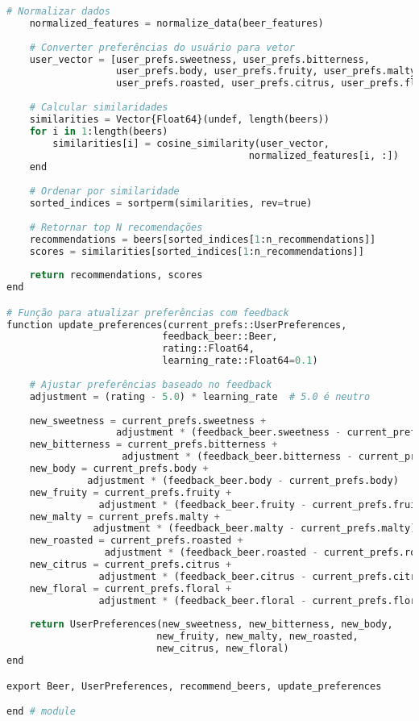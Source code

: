 \documentclass[12pt,a4paper]{article}
\begin{document}
\begin{lstlisting}[language=Python, caption=Código principal do sistema de recomendação]
    # Normalizar dados
    normalized_features = normalize_data(beer_features)
    
    # Converter preferências do usuário para vetor
    user_vector = [user_prefs.sweetness, user_prefs.bitterness,
                   user_prefs.body, user_prefs.fruity, user_prefs.malty,
                   user_prefs.roasted, user_prefs.citrus, user_prefs.floral]
    
    # Calcular similaridades
    similarities = Vector{Float64}(undef, length(beers))
    for i in 1:length(beers)
        similarities[i] = cosine_similarity(user_vector, 
                                          normalized_features[i, :])
    end
    
    # Ordenar por similaridade
    sorted_indices = sortperm(similarities, rev=true)
    
    # Retornar top N recomendações
    recommendations = beers[sorted_indices[1:n_recommendations]]
    scores = similarities[sorted_indices[1:n_recommendations]]
    
    return recommendations, scores
end

# Função para atualizar preferências com feedback
function update_preferences(current_prefs::UserPreferences,
                           feedback_beer::Beer,
                           rating::Float64,
                           learning_rate::Float64=0.1)
    
    # Ajustar preferências baseado no feedback
    adjustment = (rating - 5.0) * learning_rate  # 5.0 é neutro
    
    new_sweetness = current_prefs.sweetness + 
                   adjustment * (feedback_beer.sweetness - current_prefs.sweetness)
    new_bitterness = current_prefs.bitterness + 
                    adjustment * (feedback_beer.bitterness - current_prefs.bitterness)
    new_body = current_prefs.body + 
              adjustment * (feedback_beer.body - current_prefs.body)
    new_fruity = current_prefs.fruity + 
                adjustment * (feedback_beer.fruity - current_prefs.fruity)
    new_malty = current_prefs.malty + 
               adjustment * (feedback_beer.malty - current_prefs.malty)
    new_roasted = current_prefs.roasted + 
                 adjustment * (feedback_beer.roasted - current_prefs.roasted)
    new_citrus = current_prefs.citrus + 
                adjustment * (feedback_beer.citrus - current_prefs.citrus)
    new_floral = current_prefs.floral + 
                adjustment * (feedback_beer.floral - current_prefs.floral)
    
    return UserPreferences(new_sweetness, new_bitterness, new_body,
                          new_fruity, new_malty, new_roasted,
                          new_citrus, new_floral)
end

export Beer, UserPreferences, recommend_beers, update_preferences

end # module
\end{lstlisting}
\end{document}
